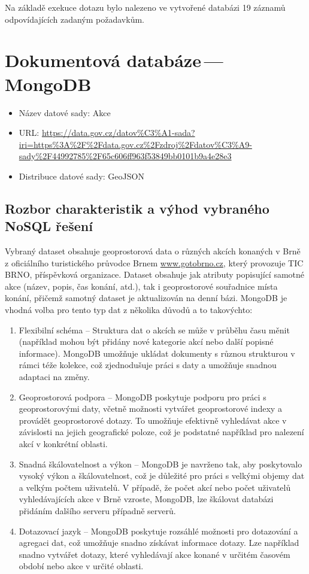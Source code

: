 \documentclass[a4paper, 11pt]{article}
\begin{document}
    Na základě exekuce dotazu bylo nalezeno ve vytvořené databázi 19 záznamů odpovídajících zadaným požadavkům.
    
    \newpage
    \section{Dokumentová databáze\,---\,MongoDB}

    \begin{itemize}
        \item Název datové sady: Akce
        \item URL: \url{https://data.gov.cz/datov%C3%A1-sada?iri=https%3A%2F%2Fdata.gov.cz%2Fzdroj%2Fdatov%C3%A9-sady%2F44992785%2F65c606ff963f53849bb0101b9a4e28e3}
        \item Distribuce datové sady: GeoJSON
    \end{itemize}

    \subsection{Rozbor charakteristik a výhod vybraného NoSQL řešení}
    Vybraný dataset obsahuje geoprostorová data o různých akcích konaných v Brně z oficiálního turistického průvodce Brnem \url{www.gotobrno.cz}, který provozuje TIC BRNO, příspěvková organizace. Dataset obsahuje jak atributy popisující samotné akce (název, popis, čas konání, atd.), tak i geoprostorové souřadnice místa konání, přičemž samotný dataset je aktualizován na denní bázi. MongoDB je vhodná volba pro tento typ dat z několika důvodů a to takovýchto:

    \begin{enumerate}
        \item Flexibilní schéma -- Struktura dat o akcích se může v průběhu času měnit (například mohou být přidány nové kategorie akcí nebo další popisné informace). MongoDB umožňuje ukládat dokumenty s různou strukturou v rámci téže kolekce, což zjednodušuje práci s daty a umožňuje snadnou adaptaci na změny.
        \item  Geoprostorová podpora -- MongoDB poskytuje podporu pro práci s geoprostorovými daty, včetně možnosti vytvářet geoprostorové indexy a provádět geoprostorové dotazy. To umožňuje efektivně vyhledávat akce v závislosti na jejich geografické poloze, což je podstatné například pro nalezení akcí v konkrétní oblasti.
        \item Snadná škálovatelnost a výkon -- MongoDB je navrženo tak, aby poskytovalo vysoký výkon a škálovatelnost, což je důležité pro práci s velkými objemy dat a velkým počtem uživatelů. V případě, že počet akcí nebo počet uživatelů vyhledávajících akce v Brně vzroste, MongoDB, lze škálovat databázi přidáním dalšího serveru případně serverů.
        \item Dotazovací jazyk -- MongoDB poskytuje rozsáhlé možnosti pro dotazování a agregaci dat, což umožňuje snadno získávat informace dotazy.  Lze například snadno vytvářet dotazy, které vyhledávají akce konané v určitém časovém období nebo akce v určité oblasti.
    \end{enumerate}
    
\end{document}
